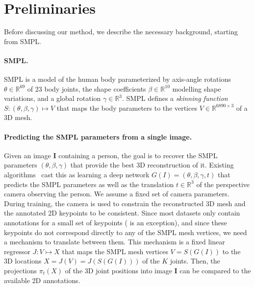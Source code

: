 \section{Preliminaries}\label{s:preliminaries}



Before discussing our method, we describe the necessary background, starting from SMPL\@.

\paragraph{SMPL.}

SMPL is a model of the human body parameterized by axis-angle rotations $\theta \in \mathbb{R}^{69}$ of 23 body joints, the shape coefficients $\beta \in \mathbb{R}^{10}$ modelling shape variations, and a global rotation $\gamma \in \mathbb{R}^{3}$.
SMPL defines a \emph{skinning function}  $S: (\theta, \beta, \gamma) \mapsto V$ that maps the body parameters to the vertices $V \in \mathbb{R}^{6890\times 3}$ of a 3D mesh.

\paragraph{Predicting the SMPL parameters from a single image.}

Given an image $\mathbf{I}$ containing a person, the goal is to recover the SMPL parameters $(\theta, \beta, \gamma)$ that provide the best 3D reconstruction of it.
Existing algorithms~\cite{kanazawa18learning} cast this as learning a deep network $G(I) = (\theta, \beta, \gamma, t)$ that predicts the SMPL parameters as well as the %
translation $t \in \mathbb{R}^3$ of the perspective camera observing the person. We assume a fixed set of camera parameters.
During training, the camera is used to constrain the reconstructed 3D mesh and the annotated 2D keypoints to be consistent.
Since most datasets only contain annotations for a small set of keypoints (\cite{guler2018densepose} is an exception), and since these keypoints do not correspond directly to any of the SMPL mesh vertices, we need a mechanism to translate between them.
This mechanism is a fixed linear regressor $J : V \mapsto X$ that maps the SMPL mesh vertices $V = S(G(I))$ to the 3D locations $X = J(V) = J(S(G(I)))$ of the $K$ joints.
Then, the projections $\pi_{t}(X)$ of the 3D joint positions into image $\mathbf{I}$ can be compared to the available 2D annotations.

